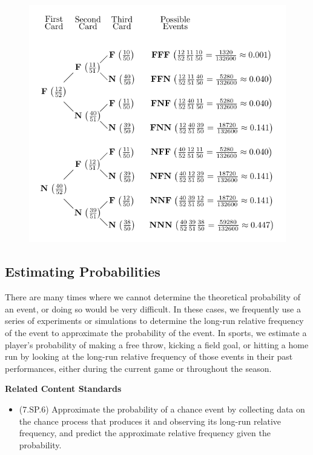 \documentclass[
]{book}
\providecommand{\tightlist}{%
  \setlength{\itemsep}{0pt}\setlength{\parskip}{0pt}}
\newenvironment{standards}{}{}
\theoremstyle{definition}
\theoremstyle{definition}
\theoremstyle{definition}
\theoremstyle{definition}
\theoremstyle{remark}
\begin{document}
\begin{figure}

{\centering \includegraphics[width=0.9\linewidth]{tikz/tree_cards_face} 

}

\end{figure}

\hypertarget{estimating-probabilities}{%
\subsection{Estimating Probabilities}\label{estimating-probabilities}}

There are many times where we cannot determine the theoretical probability of an event, or doing so would be very difficult. In these cases, we frequently use a series of experiments or simulations to determine the long-run relative frequency of the event to approximate the probability of the event. In sports, we estimate a player's probability of making a free throw, kicking a field goal, or hitting a home run by looking at the long-run relative frequency of those events in their past performances, either during the current game or throughout the season.

\begin{standards}

\begin{center}
\textbf{Related Content Standards}

\end{center}

\begin{itemize}
\tightlist
\item
  (7.SP.6) Approximate the probability of a chance event by collecting data on the chance process that produces it and observing its long-run relative frequency, and predict the approximate relative frequency given the probability.
\end{itemize}

\end{standards}
\end{document}
